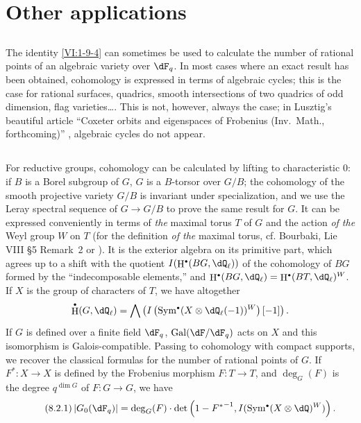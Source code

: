 \documentclass[oneside]{book}
\DeclareMathOperator{\gal}{Gal}
\DeclareMathOperator{\h}{H}
\newcounter{char}
\theoremstyle{sga-source}
\theoremstyle{sga-source-dash}
\theoremstyle{sga-source-dotdash}
\theoremstyle{sga-source-number-note-dash}
\theoremstyle{sga-source-note-number-dotdash}
\theoremstyle{sga-source-example-dotdash}
\theoremstyle{sga-source-inline-number}
\theoremstyle{sga-source-bare-number}
\theoremstyle{sga-source}
\let\oldbullet\bullet
\renewcommand{\bullet}{\textnormal{\tiny$\oldbullet$}}
\newcommand{\PrintPage}[1]{}\newcommand{\MathPage}[1]{}\newcommand{\PrintCite}[2]{#1}\newcommand{\var}[3]{#2}
\begin{document}
\PrintPage{230}
\section{Other applications}\label{VI:8}





\subsection{}\label{VI:8-1}

The identity \ref{VI:1-9-4} can sometimes be used to calculate 
the number of rational points of an algebraic variety over $\dF_q$. In 
most cases where an exact result has been obtained, cohomology 
is expressed in terms of algebraic cycles; this is the case for rational 
surfaces, quadrics, smooth intersections of two quadrics of 
odd dimension, flag varieties\ldots. This is not, however, 
always the case; in Lusztig's beautiful article ``Coxeter orbits and eigenspaces of Frobenius (Inv.~Math., forthcoming)'' \cite{lu76}, algebraic cycles 
do not appear. 





\subsection{}\label{VI:8-2}

For reductive groups, cohomology can be calculated by lifting to 
characteristic $0$: if $B$ is a Borel subgroup of $G$, $G$ is a 
$B$-torsor over $G/B$; the cohomology of the smooth projective variety 
$G/B$ is invariant under specialization, and we use the Leray spectral sequence 
of $G\to G/B$ to prove the same result for $G$. It can be expressed 
conveniently in terms of \emph{the} maximal torus $T$ of $G$ and the action 
\emph{of the} \var{Weil group $W$}{Weyl group $W$}{S45-SOL-0978} on $T$ (for the definition \emph{of the} maximal 
torus, cf. Bourbaki, Lie VIII \S 5 Remark~2 \cite[VIII \S 5 Rem.2]{bo05} or \cite[p.105]{dl76}). It is 
the exterior algebra on its primitive part, which agrees up to a shift 
with the quotient $I(\h^\bullet(B G,\dQ_\ell))$ of the cohomology of 
$B G$ formed by the ``indecomposable elements,'' and 
$\h^\bullet(B G,\dQ_\ell)=\h^\bullet(B T,\dQ_\ell)^W$. If $X$ is the group of 
characters of $T$, we have altogether 
\[
  \h^\bullet(G,\dQ_\ell) = \bigwedge \left(I\left(\operatorname{Sym}^\bullet(X\otimes \dQ_\ell(-1))^W\right)[-1]\right) \text{.}
\]
If $G$ is defined over a finite field $\dF_q$, $\gal(\dF/\dF_q)$ acts on $X$ 
and this isomorphism is Galois-compatible. Passing to 
cohomology with compact supports, we recover the classical formulas for the 
number of rational points of $G$. If $F^\ast:X\to X$ is defined by the 
Frobenius morphism $F:T\to T$, and $\deg_G(F)$ is the degree 
$q^{\dim G}$ of $F:G\to G$, we have 
\begin{equation*}\tag{8.2.1}\label{VI:eq:8-2-1}
  \left|G_0(\dF_q)\right| = \deg_G(F) \cdot \det\left(1-{F^\ast}^{-1},I(\operatorname{Sym}^\bullet(X\otimes \dQ)^W)\right) \text{.}
\end{equation*}
\end{document}
